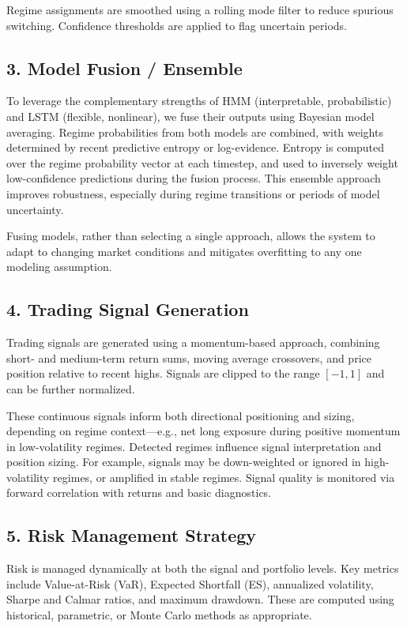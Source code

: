 Regime assignments are smoothed using a rolling mode filter to reduce spurious switching. Confidence thresholds are applied to flag uncertain periods.

\subsection{3. Model Fusion / Ensemble}
To leverage the complementary strengths of HMM (interpretable, probabilistic) and LSTM (flexible, nonlinear), we fuse their outputs using Bayesian model averaging. Regime probabilities from both models are combined, with weights determined by recent predictive entropy or log-evidence. Entropy is computed over the regime probability vector at each timestep, and used to inversely weight low-confidence predictions during the fusion process. This ensemble approach improves robustness, especially during regime transitions or periods of model uncertainty.

Fusing models, rather than selecting a single approach, allows the system to adapt to changing market conditions and mitigates overfitting to any one modeling assumption.

\subsection{4. Trading Signal Generation}
Trading signals are generated using a momentum-based approach, combining short- and medium-term return sums, moving average crossovers, and price position relative to recent highs. Signals are clipped to the range $[-1, 1]$ and can be further normalized.

These continuous signals inform both directional positioning and sizing, depending on regime context---e.g., net long exposure during positive momentum in low-volatility regimes. Detected regimes influence signal interpretation and position sizing. For example, signals may be down-weighted or ignored in high-volatility regimes, or amplified in stable regimes. Signal quality is monitored via forward correlation with returns and basic diagnostics.

\subsection{5. Risk Management Strategy}
Risk is managed dynamically at both the signal and portfolio levels. Key metrics include Value-at-Risk (VaR), Expected Shortfall (ES), annualized volatility, Sharpe and Calmar ratios, and maximum drawdown. These are computed using historical, parametric, or Monte Carlo methods as appropriate.

